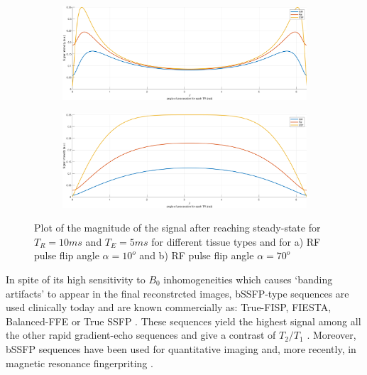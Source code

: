 \begin{figure}[ht]
    \centering
    \begin{subfigure}[b]{1\textwidth}
        \includegraphics[width=\textwidth]{images/mri/ssFA10}
    \end{subfigure}
    
    \begin{subfigure}[b]{1\textwidth}
        \includegraphics[width=\textwidth]{images/mri/ssFA70}
    \end{subfigure}
    
    \caption{Plot of the magnitude of the signal after reaching steady-state for $T_R = 10ms$ and $T_E = 5ms$ for different tissue types and for a) RF pulse flip angle $\alpha = 10^o$ and b) RF pulse flip angle $\alpha = 70^o$}
    \label{fig:sssignal}
\end{figure}

In spite of its high sensitivity to $B_0$ inhomogeneities which causes `banding artifacts' to appear in the final reconstrcted images, bSSFP-type sequences are used clinically today and are known commercially as: True-FISP, FIESTA, Balanced-FFE or True SSFP \cite{Hargreaves2012}.
These sequences yield the highest signal among all the other rapid gradient-echo sequences and give a contrast of $T_2/T_1$ \cite{Scheffler2003}.
Moreover, bSSFP sequences have been used for quantitative imaging \cite{Schmitt2004b} \cite{Gloor2008} and, more recently, in magnetic resonance fingerpriting \cite{Ma2013}.

\hfill

